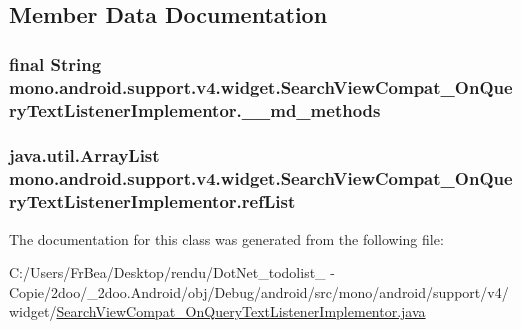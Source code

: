 \subsection{Member Data Documentation}
\hypertarget{classmono_1_1android_1_1support_1_1v4_1_1widget_1_1_search_view_compat___on_query_text_listener_implementor_289af45f7839502b7628f226984a6620}{
\subsubsection[{\_\-\_\-md\_\-methods}]{\setlength{\rightskip}{0pt plus 5cm}final String {\bf mono.android.support.v4.widget.SearchViewCompat\_\-OnQueryTextListenerImplementor.\_\-\_\-md\_\-methods}}}
\label{classmono_1_1android_1_1support_1_1v4_1_1widget_1_1_search_view_compat___on_query_text_listener_implementor_289af45f7839502b7628f226984a6620}


\hypertarget{classmono_1_1android_1_1support_1_1v4_1_1widget_1_1_search_view_compat___on_query_text_listener_implementor_d73a21b170313d151438d36ac5d1d9da}{
\subsubsection[{refList}]{\setlength{\rightskip}{0pt plus 5cm}java.util.ArrayList {\bf mono.android.support.v4.widget.SearchViewCompat\_\-OnQueryTextListenerImplementor.refList}}}
\label{classmono_1_1android_1_1support_1_1v4_1_1widget_1_1_search_view_compat___on_query_text_listener_implementor_d73a21b170313d151438d36ac5d1d9da}




The documentation for this class was generated from the following file:\begin{CompactItemize}
\item 
C:/Users/FrBea/Desktop/rendu/DotNet\_\-todolist\_ - Copie/2doo/\_\-2doo.Android/obj/Debug/android/src/mono/android/support/v4/widget/\hyperlink{_search_view_compat___on_query_text_listener_implementor_8java}{SearchViewCompat\_\-OnQueryTextListenerImplementor.java}\end{CompactItemize}

